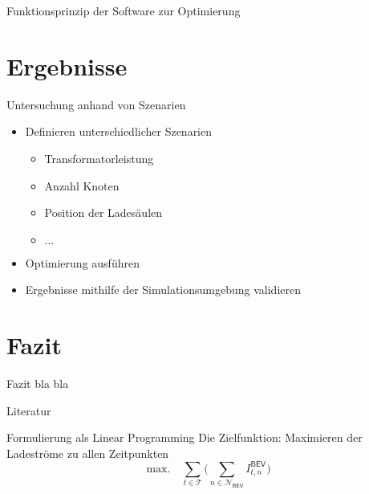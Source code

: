 \documentclass[aspectratio=169]{beamer}
\begin{document}
\begin{frame}{Funktionsprinzip der Software zur Optimierung}
	\begin{figure}
		\centering
		
	\end{figure}
\end{frame}


\section{Ergebnisse}

\begin{frame}{Untersuchung anhand von Szenarien}
	\begin{itemize}[<+->]
		\item Definieren unterschiedlicher Szenarien
		\begin{itemize}
			\item Transformatorleistung
			\item Anzahl Knoten
			\item Position der Ladesäulen
			\item $\dots$
		\end{itemize}
		\item Optimierung ausführen
		\item Ergebnisse mithilfe der Simulationsumgebung validieren
	\end{itemize}
\end{frame}


\section{Fazit}

\begin{frame}{Fazit}
	bla bla
\end{frame}


\begin{frame}{Literatur}
	\printbibliography
\end{frame}


\begin{frame}{Formulierung als Linear Programming}
	Die Zielfunktion: Maximieren der Ladeströme zu allen Zeitpunkten
	\begin{equation*}
		\text{max.}\quad\sum_{t\in\mathcal{T}}\bigg(\sum_{n\in
		\mathcal{N_\mathsf{BEV}}}\!\!I^\mathsf{BEV}_{t,n}\bigg)
	\end{equation*}
\end{frame}
\end{document}
